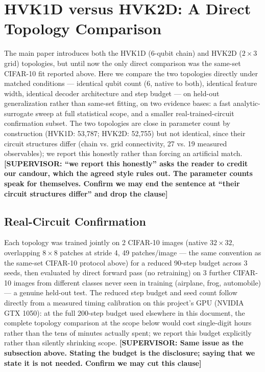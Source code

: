 \documentclass[11pt]{article}
\begin{document}
\section{HVK1D versus HVK2D: A Direct Topology Comparison}
\label{sec:topology_comparison}
The main paper introduces both the HVK1D (6-qubit chain) and HVK2D ($2\times3$ grid) topologies, but until now the only direct comparison was the same-set CIFAR-10 fit reported above. Here we compare the two topologies directly under matched conditions --- identical qubit count (6, native to both), identical feature width, identical decoder architecture and step budget --- on held-out generalization rather than same-set fitting, on two evidence bases: a fast analytic-surrogate sweep at full statistical scope, and a smaller real-trained-circuit confirmation subset. The two topologies are close in parameter count by construction (HVK1D: 53{,}787; HVK2D: 52{,}755) but not identical, since their circuit structures differ (chain vs. grid connectivity, 27 vs. 19 measured observables); we report this honestly rather than forcing an artificial match. {\color{red}\textbf{[SUPERVISOR: ``we report this honestly'' asks the reader to credit our candour, which the agreed style rules out. The parameter counts speak for themselves. Confirm we may end the sentence at ``their circuit structures differ'' and drop the clause]}}

\subsection{Real-Circuit Confirmation}
\label{sec:topology_real_circuit}
Each topology was trained jointly on 2 CIFAR-10 images (native $32\times32$, overlapping $8\times8$ patches at stride 4, 49 patches/image --- the same convention as the same-set CIFAR-10 protocol above) for a reduced 90-step budget across 3 seeds, then evaluated by direct forward pass (no retraining) on 3 further CIFAR-10 images from different classes never seen in training (airplane, frog, automobile) --- a genuine held-out test. The reduced step budget and seed count follow directly from a measured timing calibration on this project's GPU (NVIDIA GTX 1050): at the full 200-step budget used elsewhere in this document, the complete topology comparison at the scope below would cost single-digit hours rather than the tens of minutes actually spent; we report this budget explicitly rather than silently shrinking scope. {\color{red}\textbf{[SUPERVISOR: Same issue as the subsection above. Stating the budget is the disclosure; saying that we state it is not needed. Confirm we may cut this clause]}}
\end{document}
